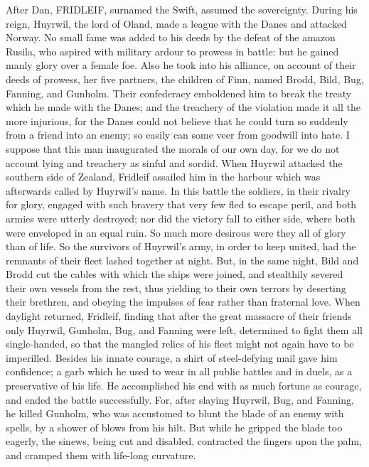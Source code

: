 \documentclass[10pt,a4paper]{report}
\begin{document}
After Dan, FRIDLEIF, surnamed the Swift, assumed the sovereignty. During his reign, Huyrwil, the lord of Oland, made a league with the Danes and attacked Norway. No small fame was added to his deeds by the defeat of the amazon Rusila, who aspired with military ardour to prowess in battle: but he gained manly glory over a female foe. Also he took into his alliance, on account of their deeds of prowess, her five partners, the children of Finn, named Brodd, Bild, Bug, Fanning, and Gunholm. Their confederacy emboldened him to break the treaty which he made with the Danes; and the treachery of the violation made it all the more injurious, for the Danes could not believe that he could turn so suddenly from a friend into an enemy; so easily can some veer from goodwill into hate. I suppose that this man inaugurated the morals of our own day, for we do not account lying and treachery as sinful and sordid. When Huyrwil attacked the southern side of Zealand, Fridleif assailed him in the harbour which was afterwards called by Huyrwil's name. In this battle the soldiers, in their rivalry for glory, engaged with such bravery that very few fled to escape peril, and both armies were utterly destroyed; nor did the victory fall to either side, where both were enveloped in an equal ruin. So much more desirous were they all of glory than of life. So the survivors of Huyrwil's army, in order to keep united, had the remnants of their fleet lashed together at night. But, in the same night, Bild and Brodd cut the cables with which the ships were joined, and stealthily severed their own vessels from the rest, thus yielding to their own terrors by deserting their brethren, and obeying the impulses of fear rather than fraternal love. When daylight returned, Fridleif, finding that after the great massacre of their friends only Huyrwil, Gunholm, Bug, and Fanning were left, determined to fight them all single-handed, so that the mangled relics of his fleet might not again have to be imperilled. Besides his innate courage, a shirt of steel-defying mail gave him confidence; a garb which he used to wear in all public battles and in duels, as a preservative of his life. He accomplished his end with as much fortune as courage, and ended the battle successfully. For, after slaying Huyrwil, Bug, and Fanning, he killed Gunholm, who was accustomed to blunt the blade of an enemy with spells, by a shower of blows from his hilt. But while he gripped the blade too eagerly, the sinews, being cut and disabled, contracted the fingers upon the palm, and cramped them with life-long curvature.\\
\end{document}
